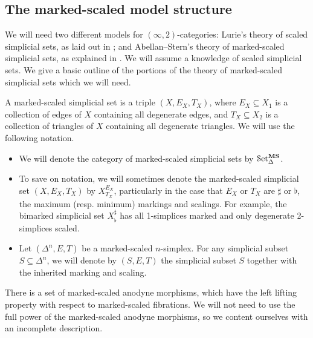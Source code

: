 \documentclass[main.tex]{subfiles}
\begin{document}
\subsection{The marked-scaled model structure}
\label{ssc:marked-scaled_model_structure}

We will need two different models for $(\infty,2)$-categories: Lurie's theory of scaled simplicial sets, as laid out in \cite{lurie2009infinity}; and Abellan--Stern's theory of marked-scaled simplicial sets, as explained in \cite{garcia2cartesianfibrationsii}. We will assume a knowledge of scaled simplicial sets. We give a basic outline of the portions of the theory of marked-scaled simplicial sets which we will need.

A marked-scaled simplicial set is a triple $(X, E_{X}, T_{X})$, where $E_{X} \subseteq X_{1}$ is a collection of edges of $X$ containing all degenerate edges, and $T_{X} \subseteq X_{2}$ is a collection of triangles of $X$ containing all degenerate triangles. We will use the following notation.
\begin{itemize}
  \item We will denote the category of marked-scaled simplicial sets by $\mathcal{S}\mathrm{et}_{\Delta}^{\mathbf{MS}}$.

  \item To save on notation, we will sometimes denote the marked-scaled simplicial set $(X, E_{X}, T_{X})$ by $X^{E_{X}}_{T_{X}}$, particularly in the case that $E_{X}$ or $T_{X}$ are $\sharp$ or $\flat$, the maximum (resp. minimum) markings and scalings. For example, the bimarked simplicial set $X^{\sharp}_{\flat}$ has all 1-simplices marked and only degenerate 2-simplices scaled.

  \item Let $(\Delta^{n}, E, T)$ be a marked-scaled $n$-simplex. For any simplicial subset $S \subseteq \Delta^{n}$, we will denote by $(S, E, T)$ the simplicial subset $S$ together with the inherited marking and scaling.
\end{itemize}

There is a set of marked-scaled anodyne morphisms, which have the left lifting property with respect to marked-scaled fibrations. We will not need to use the full power of the marked-scaled anodyne morphisms, so we content ourselves with an incomplete description.
\end{document}
